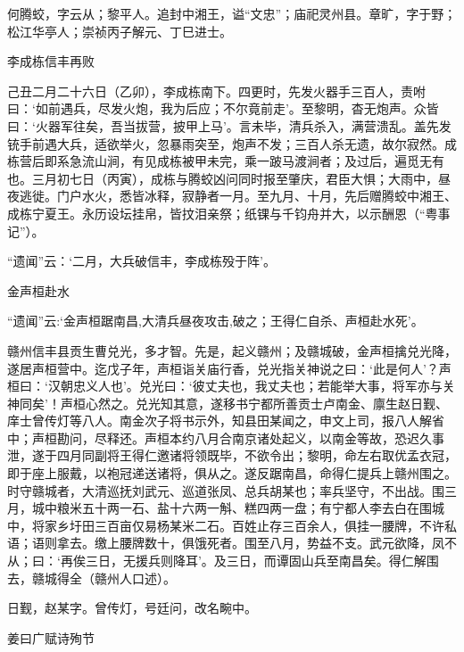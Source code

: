 \documentclass[]{article}
\begin{document}
何腾蛟，字云从；黎平人。追封中湘王，谥``文忠''；庙祀灵州县。章旷，字于野；松江华亭人；崇祯丙子解元、丁巳进士。

李成栋信丰再败

己丑二月二十六日（乙卯），李成栋南下。四更时，先发火器手三百人，责咐曰：`如前遇兵，尽发火炮，我为后应；不尔竟前走'。至黎明，杳无炮声。众皆曰：`火器军往矣，吾当拔营，披甲上马'。言未毕，清兵杀入，满营溃乱。盖先发铳手前遇大兵，适欲举火，忽暴雨突至，炮声不发；三百人杀无遗，故尔寂然。成栋营后即系急流山涧，有见成栋被甲未完，乘一跛马渡涧者；及过后，遍觅无有也。三月初七日（丙寅），成栋与腾蛟凶问同时报至肇庆，君臣大惧；大雨中，昼夜逃徙。门户水火，悉皆冰释，寂静者一月。至九月、十月，先后赠腾蛟中湘王、成栋宁夏王。永历设坛挂帛，皆抆泪亲祭；纸锞与千钧舟并大，以示酬恩（``粤事记''）。

``遗闻''云：`二月，大兵破信丰，李成栋殁于阵'。

金声桓赴水

``遗闻''云:`金声桓踞南昌,大清兵昼夜攻击,破之；王得仁自杀、声桓赴水死'。

赣州信丰县贡生曹兑光，多才智。先是，起义赣州；及赣城破，金声桓擒兑光降，遂居声桓营中。迄戊子年，声桓诣关庙行香，兑光指关神说之曰：`此是何人'？声桓曰：`汉朝忠义人也'。兑光曰：`彼丈夫也，我丈夫也；若能举大事，将军亦与关神同矣'！声桓心然之。兑光知其意，遂移书宁都所善贡士卢南金、廪生赵日觐、庠士曾传灯等八人。南金次子将书示外，知县田某闻之，申文上司，报八人解省中；声桓勘问，尽释还。声桓本约八月合南京诸处起义，以南金等故，恐迟久事泄，遂于四月同副将王得仁邀诸将领既毕，不欲令出；黎明，命左右取优孟衣冠，即于座上服戴，以袍冠递送诸将，俱从之。遂反踞南昌，命得仁提兵上赣州围之。时守赣城者，大清巡抚刘武元、巡道张凤、总兵胡某也；率兵坚守，不出战。围三月，城中粮米五十两一石、盐十六两一斛、糕四两一盘；有宁都人李去白在围城中，将家乡圩田三百亩仅易杨某米二石。百姓止存三百余人，俱挂一腰牌，不许私语；语则拿去。缴上腰牌数十，俱饿死者。围至八月，势益不支。武元欲降，凤不从；曰：`再俟三日，无援兵则降耳'。及三日，而谭固山兵至南昌矣。得仁解围去，赣城得全（赣州人口述）。

日觐，赵某字。曾传灯，号廷问，改名畹中。

姜曰广赋诗殉节
\end{document}
